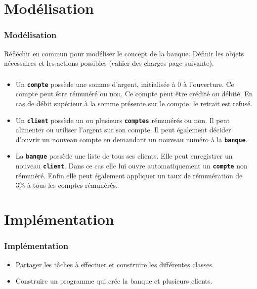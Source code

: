 \documentclass[svgnames,11pt]{beamer}
\begin{document}
\section{Modélisation}
\begin{frame}
    \frametitle{Modélisation}

    \begin{activite}
    Réfléchir en commun pour modéliser le concept de la banque. Définir les objets nécessaires et les actions possibles (cahier des charges page suivante).
    \end{activite}

\end{frame}
\begin{frame}
    \frametitle{}
    \begin{itemize}
        \item Un \texttt{\textbf{compte}} possède une somme d'argent, initialisée à 0 à l'ouverture. Ce compte peut être rémunéré ou non. Ce compte peut être crédité ou débité. En cas de débit supérieur à la somme présente sur le compte, le retrait est refusé.
        \item Un \textbf{\texttt{client}} possède un ou plusieurs \textbf{\texttt{comptes}} rémunérés ou non. Il peut alimenter ou utiliser l'argent sur son compte. Il peut également décider d'ouvrir un nouveau compte en demandant un nouveau numéro à la \textbf{\texttt{banque}}.
        \item La \textbf{\texttt{banque}} possède une liste de tous ses clients. Elle peut enregistrer un nouveau \textbf{\texttt{client}}. Dans ce cas elle lui ouvre automatiquement un \textbf{\texttt{compte}} non rémunéré. Enfin elle peut également appliquer un taux de rémunération de 3\% à tous les comptes rémunérés.
    \end{itemize}
\end{frame}
\section{Implémentation}
\begin{frame}
    \frametitle{Implémentation}

    \begin{activite}
    \begin{itemize}
        \item Partager les tâches à effectuer et construire les différentes classes.
        \item Construire un programme qui crée la banque et plusieurs clients.
    \end{itemize}
    \end{activite}

\end{frame}
\end{document}
